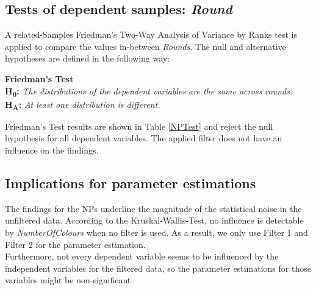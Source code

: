 
\subsection{Tests of dependent samples: \textit{Round}}
A related-Samples Friedman's Two-Way Analysis of Variance by Ranks test \citep{Friedman1937} is applied to compare the values in-between \textit{Rounds}. The null and alternative hypotheses are defined in the following way:

\textbf{Friedman's Test} \\ 
\textbf{H\textsubscript{0}:} \textit{The distributions of the dependent variables are the same across rounds.}\\
\textbf{H\textsubscript{A}:} \textit{At least one distribution is different.}

Friedman's Test results are shown in Table \ref{NPTest} and reject the null hypothesis for all dependent variables. The applied filter does not have an influence on the findings.

\subsection{Implications for parameter estimations}
The findings for the \ac{NP}s underline the magnitude of the statistical noise in the unfiltered data. According to the Kruskal-Wallis-Test, no influence is detectable by \textit{NumberOfColours} when no filter is used. As a result, we only use Filter 1 and Filter 2 for the parameter estimation.\\
Furthermore, not every dependent variable seems to be influenced by the independent variables for the filtered data, so the parameter estimations for those variables might be non-significant.
\newpage
